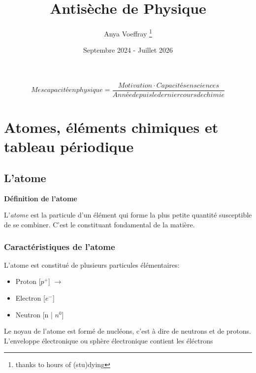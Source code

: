\documentclass{article}
\title{Antisèche de Physique}
\author{Anya Voeffray \thanks{thanks to hours of (stu)dying}}
\date{Septembre 2024 - Juillet 2026}
\begin{document}
\begin{titlepage}
\maketitle

\begin{equation}
  Mes capacité en physique = \frac{Motivation \cdot Capacités en sciences}{Année depuis le dernier cours de chimie}
\end{equation}

\end{titlepage}


\section{Atomes, éléments chimiques et tableau périodique}

\subsection{L'atome}

\textbf{Définition de l'atome}

L'\textit{atome} est la particule d'un élément qui forme la plus petite quantité susceptible de se combiner.
C'est le constituant fondamental de la matière. 

\subsubsection{Caractéristiques de l'atome}

L'atome est constitué de plusieurs particules élémentaires:

\begin{itemize}
  \item Proton [$p^+$] $\rightarrow$ 
  \item Electron [$e^-$] \rightarrow {}
  \item Neutron [n | $n^0$] \rightarrow {}
\end{itemize}

Le noyau de l'atome est formé de nucléons, c'est à dire de neutrons et de protons.
L'enveloppe électronique ou sphère électronique contient les éléctrons
\end{document}
